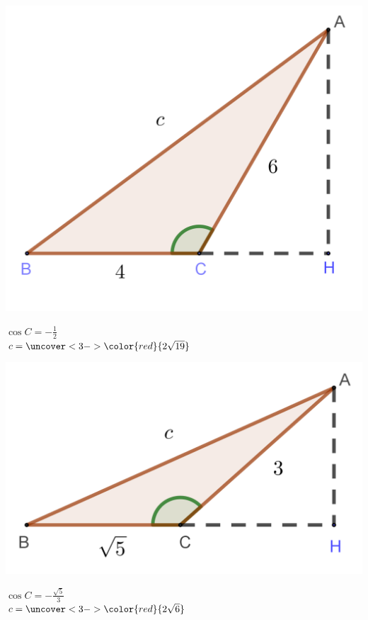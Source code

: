 \documentclass[t,8pt]{beamer}
\newcommand{\red}[1]{\color{red}{#1}}
\begin{document}
\begin{frame}{\subsecname}
\begin{minipage}{.26\textwidth}\centering
\includegraphics[width=\textwidth]{img/3-3_coslaw_2-3}
\end{minipage}
\begin{minipage}{.15\textwidth}\centering
\(\cos C=-\frac12\)\\[20pt]
\(c=\uncover<3->{\red{2\sqrt{19}}}\)
\end{minipage}
\qquad\qquad\quad
\begin{minipage}{.26\textwidth}\centering
\includegraphics[width=\textwidth]{img/3-3_coslaw_2-4}
\end{minipage}
\begin{minipage}{.15\textwidth}\centering
\(\cos C=-\frac{\sqrt5}3\)\\[20pt]
\(c=\uncover<3->{\red{2\sqrt6}}\)
\end{minipage}
\end{frame}
\end{document}
